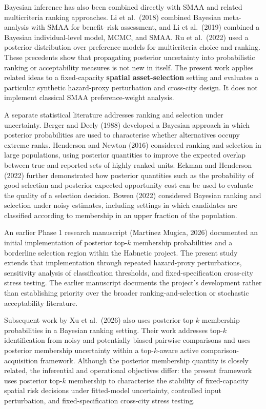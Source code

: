 \documentclass[
]{article}
\begin{document}
Bayesian inference has also been combined directly with SMAA and related
multicriteria ranking approaches. Li et al.~(2018) combined Bayesian
meta-analysis with SMAA for benefit--risk assessment, and Li et
al.~(2019) combined a Bayesian individual-level model, MCMC, and SMAA.
Ru et al.~(2022) used a posterior distribution over preference models
for multicriteria choice and ranking. These precedents show that
propagating posterior uncertainty into probabilistic ranking or
acceptability measures is not new in itself. The present work applies
related ideas to a fixed-capacity \textbf{spatial asset-selection}
setting and evaluates a particular synthetic hazard-proxy perturbation
and cross-city design. It does not implement classical SMAA
preference-weight analysis.

A separate statistical literature addresses ranking and selection under
uncertainty. Berger and Deely (1988) developed a Bayesian approach in
which posterior probabilities are used to characterise whether
alternatives occupy extreme ranks. Henderson and Newton (2016)
considered ranking and selection in large populations, using posterior
quantities to improve the expected overlap between true and reported
sets of highly ranked units. Eckman and Henderson (2022) further
demonstrated how posterior quantities such as the probability of good
selection and posterior expected opportunity cost can be used to
evaluate the quality of a selection decision. Bowen (2022) considered
Bayesian ranking and selection under noisy estimates, including settings
in which candidates are classified according to membership in an upper
fraction of the population.

An earlier Phase 1 research manuscript (Martínez Mugica, 2026)
documented an initial implementation of posterior top-\(k\) membership
probabilities and a borderline selection region within the Habnetic
project. The present study extends that implementation through repeated
hazard-proxy perturbations, sensitivity analysis of classification
thresholds, and fixed-specification cross-city stress testing. The
earlier manuscript documents the project's development rather than
establishing priority over the broader ranking-and-selection or
stochastic acceptability literature.

Subsequent work by Xu et al.~(2026) also uses posterior top-\(k\)
membership probabilities in a Bayesian ranking setting. Their work
addresses top-\(k\) identification from noisy and potentially biased
pairwise comparisons and uses posterior membership uncertainty within a
top-\(k\)-aware active comparison-acquisition framework. Although the
posterior membership quantity is closely related, the inferential and
operational objectives differ: the present framework uses posterior
top-\(k\) membership to characterise the stability of fixed-capacity
spatial risk decisions under fitted-model uncertainty, controlled input
perturbation, and fixed-specification cross-city stress testing.
\end{document}
